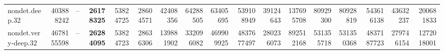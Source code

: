 \documentclass[varwidth,border=2pt]{standalone}
\begin{document}
\begin{center}
{\begin{tabular}{lrrrrrrrrrrrrrrrr}
nondet.deep.32 & 403888242 & -- & \textbf{26178325} & 53824725 & 28604571 & 42408356 & 64288505 & 63405695 & 539108949 & 39124643 & 137695708 & 80929300 & 80928819 & 543616138 & 43632237 & 200681833 \\
nondet.very-deep.32 & 4678155598 & -- & \textbf{26284095} & 53824723 & 28636306 & 139881902 & 332096082 & 469909925 & 4837677497 & 280236073 & 892512168 & 531355718 & 531350368 & 4837187723 & 279746154 & 1272018001 \\
\bottomrule
\end{tabular}
}
\end{center}
\end{document}

